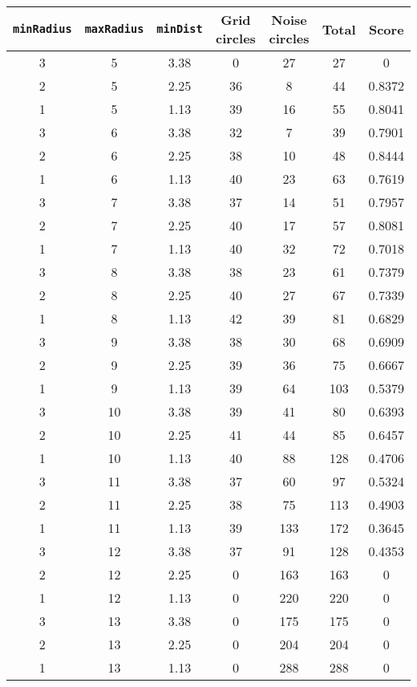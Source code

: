 \documentclass[letterpaper, 12pt]{article}
\begin{document}
\begin{longtable}{|c|c|c|c|c|c|c|}
\hline
\textbf{\texttt{minRadius}} & \textbf{\texttt{maxRadius}} & \textbf{\texttt{minDist}} & \textbf{Grid circles} & \textbf{Noise circles} & \textbf{Total} & \textbf{Score} \\
\hline
3 & 5 & 3.38 & 0 & 27 & 27 & 0 \\
\hline
2 & 5 & 2.25 & 36 & 8 & 44 & 0.8372 \\
\hline
1 & 5 & 1.13 & 39 & 16 & 55 & 0.8041 \\
\hline
3 & 6 & 3.38 & 32 & 7 & 39 & 0.7901 \\
\hline
2 & 6 & 2.25 & 38 & 10 & 48 & 0.8444 \\
\hline
1 & 6 & 1.13 & 40 & 23 & 63 & 0.7619 \\
\hline
3 & 7 & 3.38 & 37 & 14 & 51 & 0.7957 \\
\hline
2 & 7 & 2.25 & 40 & 17 & 57 & 0.8081 \\
\hline
1 & 7 & 1.13 & 40 & 32 & 72 & 0.7018 \\
\hline
3 & 8 & 3.38 & 38 & 23 & 61 & 0.7379 \\
\hline
2 & 8 & 2.25 & 40 & 27 & 67 & 0.7339 \\
\hline
1 & 8 & 1.13 & 42 & 39 & 81 & 0.6829 \\
\hline
3 & 9 & 3.38 & 38 & 30 & 68 & 0.6909 \\
\hline
2 & 9 & 2.25 & 39 & 36 & 75 & 0.6667 \\
\hline
1 & 9 & 1.13 & 39 & 64 & 103 & 0.5379 \\
\hline
3 & 10 & 3.38 & 39 & 41 & 80 & 0.6393 \\
\hline
2 & 10 & 2.25 & 41 & 44 & 85 & 0.6457 \\
\hline
1 & 10 & 1.13 & 40 & 88 & 128 & 0.4706 \\
\hline
3 & 11 & 3.38 & 37 & 60 & 97 & 0.5324 \\
\hline
2 & 11 & 2.25 & 38 & 75 & 113 & 0.4903 \\
\hline
1 & 11 & 1.13 & 39 & 133 & 172 & 0.3645 \\
\hline
3 & 12 & 3.38 & 37 & 91 & 128 & 0.4353 \\
\hline
2 & 12 & 2.25 & 0 & 163 & 163 & 0 \\
\hline
1 & 12 & 1.13 & 0 & 220 & 220 & 0 \\
\hline
3 & 13 & 3.38 & 0 & 175 & 175 & 0 \\
\hline
2 & 13 & 2.25 & 0 & 204 & 204 & 0 \\
\hline
1 & 13 & 1.13 & 0 & 288 & 288 & 0 \\

\end{longtable}
\end{document}
